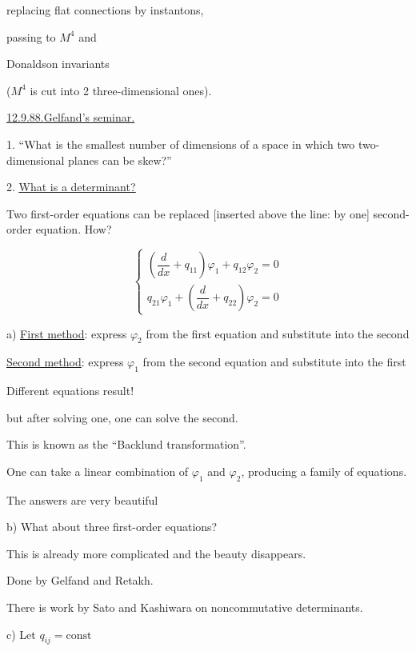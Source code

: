 replacing flat connections by instantons,

passing to $M^4$ and

Donaldson invariants

($M^4$ is cut into 2 three-dimensional ones).

\underline{12.9.88.}\qquad \underline{\underline{Gelfand's seminar.}}

1. “What is the smallest number of dimensions of a space in which two
two-dimensional planes can be skew?”

2. \underline{\underline{What is a determinant?}}

Two first-order equations can be replaced [inserted above the line: by one]
second-order equation. How?

\begin{equation*}
\begin{cases}
\left(\dfrac{d}{dx}+q_{11}\right)\varphi_1+q_{12}\varphi_2=0\\
q_{21}\varphi_1+\left(\dfrac{d}{dx}+q_{22}\right)\varphi_2=0
\end{cases}
\tag{1}
\end{equation*}

a) \underline{First method}: express $\varphi_2$ from the first equation and substitute into the second

\underline{Second method}: express $\varphi_1$ from the second equation and substitute into the first

Different equations result!

but after solving one, one can solve the second.

This is known as the “Backlund transformation”.

One can take a linear combination of $\varphi_1$ and $\varphi_2$, producing a family of equations.

The answers are very beautiful

b) What about three first-order equations?

This is already more complicated and the beauty disappears.

Done by Gelfand and Retakh.

There is work by Sato and Kashiwara on noncommutative determinants.

c) Let $q_{ij}=\mathrm{const}$

